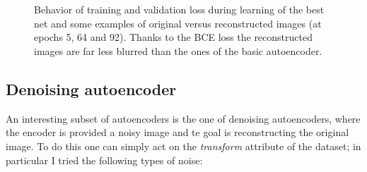 \documentclass[a4paper, 11pt]{article}
\begin{document}
    \begin{figure}
      \centering
       \,
       \\
       \,
      \caption{Behavior of training and validation loss during learning of the best net and some examples of original versus reconstructed images (at epochs 5, 64 and 92). Thanks to the BCE loss the reconstructed images are far less blurred than the ones of the basic autoencoder.}
      \label{fig:best}
    \end{figure}

  \subsection{Denoising autoencoder}
    An interesting subset of autoencoders is the one of denoising autoencoders, where the encoder is provided a noisy image and te goal is reconstructing the original image. To do this one can simply act on the \emph{transform} attribute of the dataset; in particular I tried the following types of noise:
\end{document}
